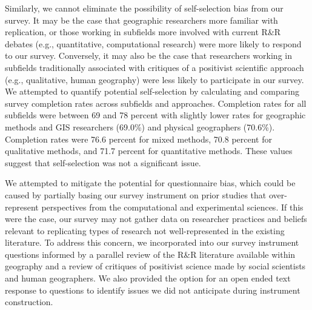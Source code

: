 \documentclass[]{interact}
\theoremstyle{plain}%
\theoremstyle{definition}
\theoremstyle{remark}
\begin{document}
Similarly, we cannot eliminate the possibility of self-selection bias from our survey. 
It may be the case that geographic researchers more familiar with replication, or those working in subfields more involved with current R\&R debates (e.g., quantitative, computational research) were more likely to respond to our survey. 
Conversely, it may also be the case that researchers working in subfields traditionally associated with critiques of a positivist scientific approach (e.g., qualitative, human geography) were less likely to participate in our survey. 
We attempted to quantify potential self-selection by calculating and comparing survey completion rates across subfields and approaches. 
Completion rates for all subfields were between 69 and 78 percent with slightly lower rates for geographic methods and GIS researchers (69.0\%) and physical geographers (70.6\%).
Completion rates were 76.6 percent for mixed methods, 70.8 percent for qualitative methods, and 71.7 percent for quantitative methods. 
These values suggest that self-selection was not a significant issue.

We attempted to mitigate the potential for questionnaire bias, which could be caused by partially basing our survey instrument on prior studies that over-represent perspectives from the computational and experimental sciences.
If this were the case, our survey may not gather data on researcher practices and beliefs relevant to replicating types of research not well-represented in the existing literature. 
To address this concern, we incorporated into our survey instrument questions informed by a parallel review of the R\&R literature available within geography and a review of critiques of positivist science made by social scientists and human geographers.
We also provided the option for an open ended text response to questions to identify issues we did not anticipate during instrument construction.  
\end{document}
